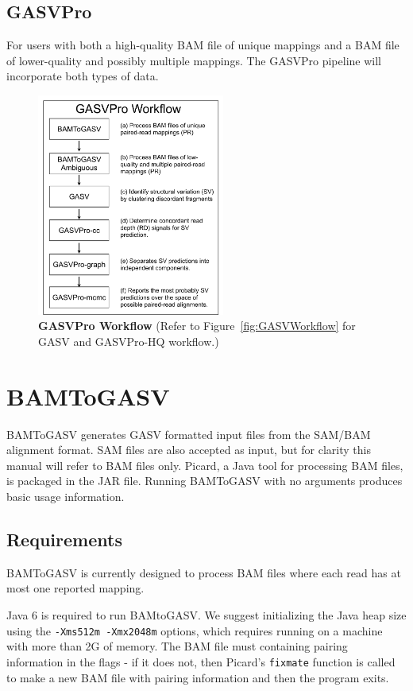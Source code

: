 \documentclass[11pt]{article}
\begin{document}
\subsection{GASVPro}
For users with both a high-quality BAM file of unique mappings and a BAM file of lower-quality and possibly multiple mappings. The GASVPro pipeline will incorporate both types of data. 

\begin{figure}[htbp]
   \centering
    \includegraphics[width=0.55\textwidth]{Figures/GASVPro_Workflow.pdf}
  \caption{\textbf{GASVPro Workflow} (Refer to Figure~\ref{fig:GASVWorkflow} for GASV and GASVPro-HQ workflow.)}
  \label{fig:GASVProWorkflow}
\end{figure}

\section{BAMToGASV}

BAMToGASV generates GASV formatted input files from the SAM/BAM alignment format. SAM files are also accepted as input, but for clarity this manual will refer to BAM files only.  Picard, a Java tool for processing BAM files, is packaged in the JAR file. Running BAMToGASV with no arguments produces basic usage information.

\subsection{Requirements}
   
BAMToGASV is currently designed to process BAM files where each read has at most one reported mapping. 

 Java 6 is required to run BAMtoGASV.  We suggest initializing the Java heap size using the \texttt{-Xms512m -Xmx2048m} options, which requires running on a machine with more than 2G of memory.  The BAM file must containing pairing information in the flags - if it does not, then Picard's \texttt{fixmate} function is called to make a new BAM file with pairing information and then the program exits.  
\end{document}
